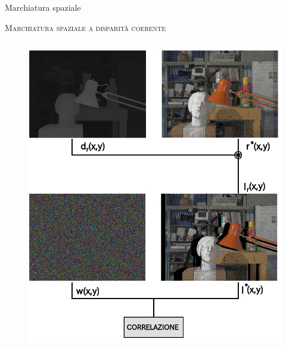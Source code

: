 \documentclass{beamer}
\begin{document}
\begin{section}{Marchiatura spaziale}
\begin{frame}[t]{\textsc{Marchiatura spaziale a disparit\`{a} coerente}}
\begin{columns}
\begin{column}{5cm}
\begin{center}
\begin{figure}
\includegraphics[width=0.9\linewidth]{./img/warp2.png}
\end{figure}
\end{center}
\end{column}
\end{columns}
\end{frame}




\end{section}
\end{document}
